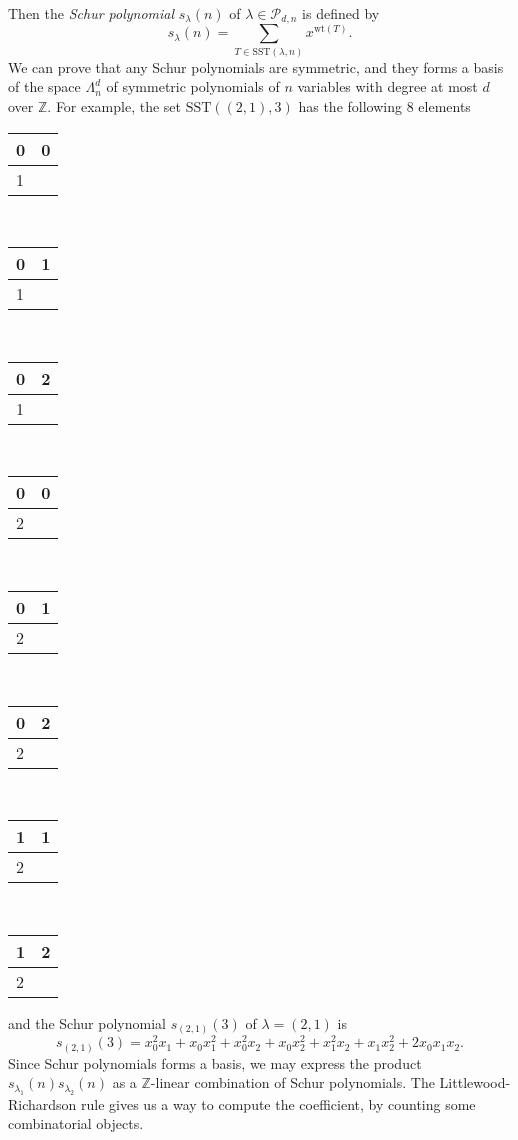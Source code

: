 \documentclass{article}
\newcommand{\SST}{\mathrm{SST}}
\newcommand{\wt}{\mathrm{wt}}
\begin{document}
Then the \emph{Schur polynomial} $s_{\lambda}(n)$ of $\lambda\in \mathcal{P}_{d, n}$ is defined by 
$$
s_{\lambda}(n) = \sum_{T\in \SST(\lambda, n)} x^{\wt(T)}. 
$$
We can prove that any Schur polynomials are symmetric, and they forms a basis of the space $\Lambda_{n}^{d}$ of symmetric polynomials of $n$ variables with degree at most $d$ over $\mathbb{Z}$. 
For example, the set $\SST((2, 1), 3)$ has the following 8 elements
\begin{center}
\begin{tabular}{|l|l}
\hline
0 & \multicolumn{1}{l|}{0} \\ \hline
1 &                        \\ \cline{1-1}
\end{tabular}\,
\begin{tabular}{|l|l}
\hline
0 & \multicolumn{1}{l|}{1} \\ \hline
1 &                        \\ \cline{1-1}
\end{tabular}\,
\begin{tabular}{|l|l}
\hline
0 & \multicolumn{1}{l|}{2} \\ \hline
1 &                        \\ \cline{1-1}
\end{tabular}\,
\begin{tabular}{|l|l}
\hline
0 & \multicolumn{0}{l|}{0} \\ \hline
2 &                        \\ \cline{1-1}
\end{tabular}\,
\begin{tabular}{|l|l}
\hline
0 & \multicolumn{0}{l|}{1} \\ \hline
2 &                        \\ \cline{1-1}
\end{tabular}\,
\begin{tabular}{|l|l}
\hline
0 & \multicolumn{0}{l|}{2} \\ \hline
2 &                        \\ \cline{1-1}
\end{tabular}\,
\begin{tabular}{|l|l}
\hline
1& \multicolumn{1}{l|}{1} \\ \hline
2 &                        \\ \cline{1-1}
\end{tabular}\,
\begin{tabular}{|l|l}
\hline
1 & \multicolumn{1}{l|}{2} \\ \hline
2 &                        \\ \cline{1-1}
\end{tabular}
\end{center}
and the  Schur polynomial $s_{(2, 1)}(3)$ of $\lambda = (2, 1)$ is
$$
s_{(2, 1)}(3) = x_{0}^{2}x_{1} + x_{0}x_{1}^{2} + x_{0}^{2}x_{2} + x_{0}x_{2}^{2} + x_{1}^{2}x_{2} + x_{1}x_{2}^{2} + 2x_{0}x_{1}x_{2}. 
$$
Since Schur polynomials forms a basis, we may express the product $s_{\lambda_{1}}(n)s_{\lambda_{2}}(n)$ as a $\mathbb{Z}$-linear combination of Schur polynomials. The Littlewood-Richardson rule gives us a way to compute the coefficient, by counting some combinatorial objects. 
\end{document}
